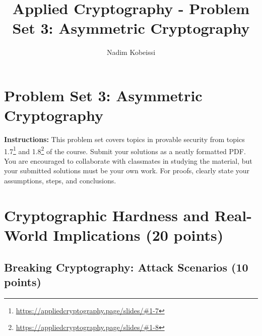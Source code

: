 \documentclass[10pt,a4paper,american]{article}
\title{Applied Cryptography - Problem Set 3: Asymmetric Cryptography}
\author{Nadim Kobeissi}
\begin{document}
\classhandoutheader
\section*{Problem Set 3: Asymmetric Cryptography}

\begin{tcolorbox}[colframe=OliveGreen!30!white,colback=OliveGreen!5!white]
	\textbf{Instructions:} This problem set covers topics in provable security from topics 1.7\footnote{\url{https://appliedcryptography.page/slides/\#1-7}} and 1.8\footnote{\url{https://appliedcryptography.page/slides/\#1-8}} of the course. Submit your solutions as a neatly formatted PDF. You are encouraged to collaborate with classmates in studying the material, but your submitted solutions must be your own work. For proofs, clearly state your assumptions, steps, and conclusions.
\end{tcolorbox}

\section{Cryptographic Hardness and Real-World Implications (20 points)}

\subsection{Breaking Cryptography: Attack Scenarios (10 points)}
\end{document}
